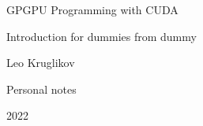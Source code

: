 \documentclass[12pt]{article}
\newcommand\titleofdoc{GPGPU Programming with CUDA} %
\newcommand\GroupName{Leo Kruglikov} %
\begin{document}
\begin{titlepage}
   \begin{center}
        \vspace*{4cm} %

        \Huge{\titleofdoc{}} 

        \vspace{0.5cm}
        \LARGE{Introduction for dummies from dummy}
            
        \vspace{3 cm}
        \Large{\GroupName}
       
       
        \vspace{3 cm}
        \Large{Personal notes}
        
        \vspace{0.25 cm}
        \Large{2022}
       

       \vfill
    \end{center}
\end{titlepage}

\setcounter{page}{2}
\pagestyle{fancy}
\fancyhf{}
\rhead{\thepage}

\renewcommand{\baselinestretch}{0.75}\normalsize
\tableofcontents
\renewcommand{\baselinestretch}{1}\normalsize
\end{document}
